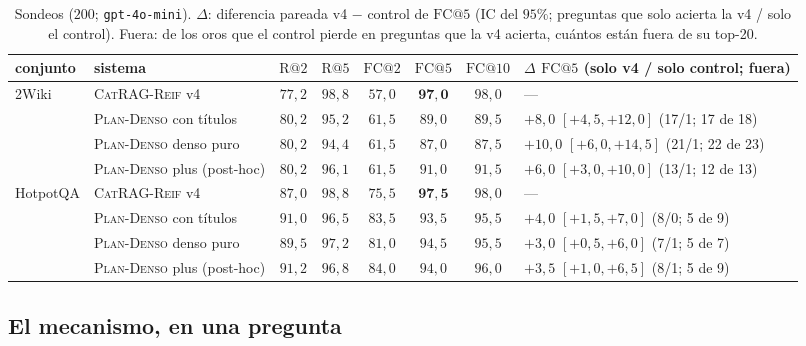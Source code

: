 \documentclass[11pt,a4paper]{article}
\newcommand{\sys}{\textsc{CatRAG-Reif}}
\newcommand{\gl}{\guillemotleft}
\newcommand{\gr}{\guillemotright}
\newcommand{\ctrl}{\textsc{Plan-Denso}}
\begin{document}
\begin{table}[t]
\centering\footnotesize\setlength{\tabcolsep}{4pt}
\caption{Sondeos ($200$; \texttt{gpt-4o-mini}). $\Delta$: diferencia
pareada v4 $-$ control de $\mathrm{FC@}5$ (IC del $95\%$; preguntas que solo
acierta la v4 / solo el control). \gl{}Fuera\gr{}: de los oros que el control
pierde en preguntas que la v4 acierta, cuántos están fuera de su top-20.}
\label{tab:sondeos}
\begin{tabular}{llcccccl}
\toprule
conjunto & sistema & $\mathrm{R@}2$ & $\mathrm{R@}5$ & $\mathrm{FC@}2$ & $\mathrm{FC@}5$ & $\mathrm{FC@}10$ & $\Delta$ $\mathrm{FC@}5$ (solo v4 / solo control; fuera)\\
\midrule
2Wiki & \sys{} v4 & $77{,}2$ & $98{,}8$ & $57{,}0$ & $\mathbf{97{,}0}$ & $98{,}0$ & ---\\
 & \ctrl{} con títulos & $80{,}2$ & $95{,}2$ & $61{,}5$ & $89{,}0$ & $89{,}5$ & $+8{,}0$ $[+4{,}5,+12{,}0]$ (17/1; 17 de 18)\\
 & \ctrl{} denso puro & $80{,}2$ & $94{,}4$ & $61{,}5$ & $87{,}0$ & $87{,}5$ & $+10{,}0$ $[+6{,}0,+14{,}5]$ (21/1; 22 de 23)\\
 & \ctrl{} plus (post-hoc) & $80{,}2$ & $96{,}1$ & $61{,}5$ & $91{,}0$ & $91{,}5$ & $+6{,}0$ $[+3{,}0,+10{,}0]$ (13/1; 12 de 13)\\
\midrule
HotpotQA & \sys{} v4 & $87{,}0$ & $98{,}8$ & $75{,}5$ & $\mathbf{97{,}5}$ & $98{,}0$ & ---\\
 & \ctrl{} con títulos & $91{,}0$ & $96{,}5$ & $83{,}5$ & $93{,}5$ & $95{,}5$ & $+4{,}0$ $[+1{,}5,+7{,}0]$ (8/0; 5 de 9)\\
 & \ctrl{} denso puro & $89{,}5$ & $97{,}2$ & $81{,}0$ & $94{,}5$ & $95{,}5$ & $+3{,}0$ $[+0{,}5,+6{,}0]$ (7/1; 5 de 7)\\
 & \ctrl{} plus (post-hoc) & $91{,}2$ & $96{,}8$ & $84{,}0$ & $94{,}0$ & $96{,}0$ & $+3{,}5$ $[+1{,}0,+6{,}5]$ (8/1; 5 de 9)\\
\bottomrule
\end{tabular}
\end{table}

\subsection{El mecanismo, en una pregunta}
\label{sec:mecanismo}
\end{document}
